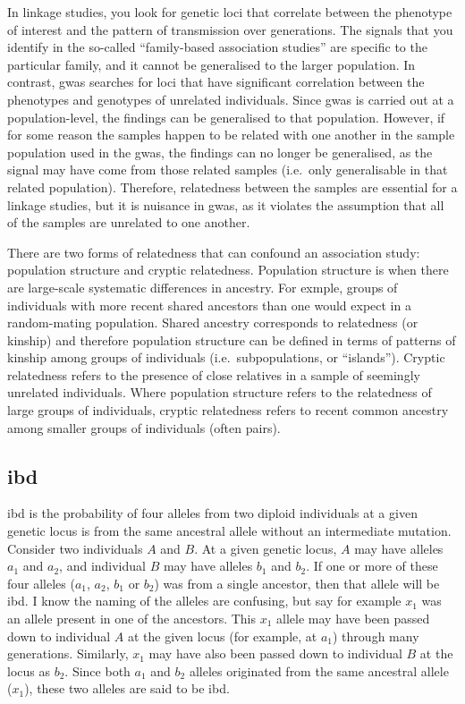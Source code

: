 In linkage studies, you look for genetic loci that correlate between the phenotype of interest and the pattern of transmission over generations.
The signals that you identify in the so-called ``family-based association studies'' are specific to the particular family, and it cannot be generalised to the larger population.
In contrast, \gls{gwas} searches for loci that have significant correlation between the phenotypes and genotypes of unrelated individuals.
Since \gls{gwas} is carried out at a population-level, the findings can be generalised to that population.
However, if for some reason the samples happen to be related with one another in the sample population used in the \gls{gwas}, the findings can no longer be generalised, as the signal may have come from those related samples (i.e.\ only generalisable in that related population).
Therefore, relatedness between the samples are essential for a linkage studies, but it is nuisance in \gls{gwas}, as it violates the assumption that all of the samples are unrelated to one another.

There are two forms of relatedness that can confound an association study: population structure and cryptic relatedness.
Population structure is when there are large-scale systematic differences in ancestry.
For exmple, groups of individuals with more recent shared ancestors than one would expect in a random-mating population.
Shared ancestry corresponds to relatedness (or kinship) and therefore population structure can be defined in terms of patterns of kinship among groups of individuals (i.e.\ subpopulations, or ``islands'').
Cryptic relatedness refers to the presence of close relatives in a sample of seemingly unrelated individuals.
Where population structure refers to the relatedness of large groups of individuals, cryptic relatedness refers to recent common ancestry among smaller groups of individuals (often pairs).





\subsection{\Acrfull{ibd}}
\label{sub:ibd}

\Gls{ibd} is the probability of four alleles from two diploid individuals at a given genetic locus is from the same ancestral allele without an intermediate mutation.
Consider two individuals $A$ and $B$.
At a given genetic locus, $A$ may have alleles $a_1$ and $a_2$, and individual $B$ may have alleles $b_1$ and  $b_2$.
If one or more of these four alleles ($a_1$,  $a_2$, $b_1$ or $b_2$) was from a single ancestor, then that allele will be \gls{ibd}.
I know the naming of the alleles are confusing, but say for example $x_1$ was an allele present in one of the ancestors.
This $x_1$ allele may have been passed down to individual $A$ at the given locus (for example, at $a_1$) through many generations.
Similarly, $x_1$ may have also been passed down to individual $B$ at the locus as $b_2$.
Since both $a_1$ and $b_2$ alleles originated from the same ancestral allele ($x_1$), these two alleles are said to be \gls{ibd}.

